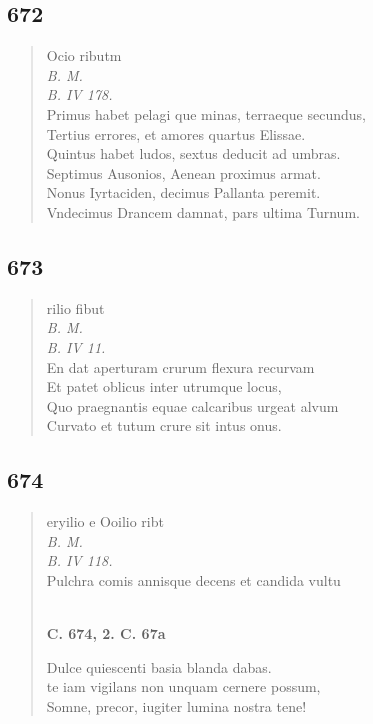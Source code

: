 \documentclass[11pt, a4paper]{report}
\begin{document}
            \subsection*{672}
      \begin{verse}
      Ocio ributm \\ \textit{B. M.} \\ \textit{B. IV 178.} \\ Primus habet pelagi \lbrack que \rbrack  minas, terraeque secundus, \\ Tertius errores, et amores quartus Elissae. \\ Quintus habet ludos, sextus deducit ad umbras. \\ Septimus Ausonios, Aenean proximus armat. \\ Nonus Iyrtaciden, decimus Pallanta peremit. \\ Vndecimus Drancem damnat, pars ultima Turnum. \\ 
      \end{verse}
  
            \subsection*{673}
      \begin{verse}
      rilio fibut \\ \textit{B. M.} \\ \textit{B. IV 11.} \\ En dat aperturam crurum flexura recurvam \\ Et patet oblicus inter utrumque locus, \\ Quo praegnantis equae calcaribus urgeat alvum \\ Curvato et tutum crure sit intus onus. \\ 
      \end{verse}
  
            \subsection*{674}
      \begin{verse}
      eryilio e Ooilio ribt \\ \textit{B. M.} \\ \textit{B. IV 118.} \\ Pulchra comis annisque decens et candida vultu \\ 
        ﻿\pagebreak 
     \marginpar{[150]} \begin{center} \textbf{C. 674, 2. C. 67a} \end{center}Dulce quiescenti basia blanda dabas. \\ te iam vigilans non unquam cernere possum, \\ Somne, precor, iugiter lumina nostra tene! \\ 
      \end{verse}
  
\end{document}
